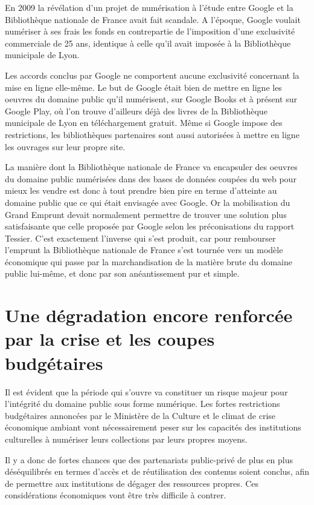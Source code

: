 En 2009 la révélation d’un projet de numérisation à l’étude entre Google et la Bibliothèque nationale de France avait fait scandale. A l’époque, Google voulait numériser à ses frais les fonds en contrepartie de l’imposition d’une exclusivité commerciale de 25 ans, identique à celle qu’il avait imposée à la Bibliothèque municipale de Lyon.

Les accords conclus par Google ne comportent aucune exclusivité concernant la mise en ligne elle-même. Le but de Google était bien de mettre en ligne les oeuvres du domaine public qu’il numérisent, sur Google Books et à présent sur Google Play, où l’on trouve d’ailleurs déjà des livres de la Bibliothèque municipale de Lyon en téléchargement gratuit. Même si Google impose des restrictions, les bibliothèques partenaires sont aussi autorisées à mettre en ligne les ouvrages sur leur propre site.

La manière dont la Bibliothèque nationale de France va encapsuler des oeuvres du domaine public numérisées dans des bases de données coupées du web pour mieux les vendre est donc à tout prendre bien pire en terme d’atteinte au domaine public que ce qui était envisagée avec Google. Or la mobilisation du Grand Emprunt devait normalement permettre de trouver une solution plus satisfaisante que celle proposée par Google selon les préconisations du rapport Tessier. C’est exactement l’inverse qui s’est produit, car pour rembourser l'emprunt la Bibliothèque nationale de France s’est tournée vers un modèle économique qui passe par la marchandisation de la matière brute du domaine public lui-même, et donc par son anéantissement pur et simple.

\section{Une dégradation encore renforcée par la crise et les coupes budgétaires}

Il est évident que la période qui s’ouvre va constituer un risque majeur pour l’intégrité du domaine public sous forme numérique. Les fortes restrictions budgétaires annoncées par le Ministère de la Culture et le climat de crise économique ambiant vont nécessairement peser sur les capacités des institutions culturelles à numériser leurs collections par leurs propres moyens.

Il y a donc de fortes chances que des partenariats public-privé de plus en plus déséquilibrés en termes d’accès et de réutilisation des contenus soient conclus, afin de permettre aux institutions de dégager des ressources propres. Ces considérations économiques vont être très difficile à contrer.

